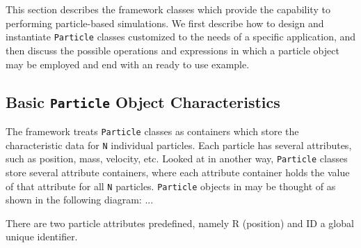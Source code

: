 \chapter{}
\label{sec:particles}
This section describes the \ippl framework classes which provide the capability to performing particle-based simulations. We first describe how to design and instantiate \texttt{Particle} classes customized to the needs of a specific application, and then discuss the possible operations and expressions in which a particle object may be employed and end with an ready to use example.

\section{Basic \texttt{Particle} Object Characteristics}

The \ippl framework treats \texttt{Particle} classes as containers which store the characteristic data for \texttt{N} individual particles. Each particle has several attributes, such as position, mass, velocity, etc. Looked at in another way, \texttt{Particle} classes store several attribute containers, where each attribute container holds the value of that attribute for all \texttt{N} particles. \texttt{Particle} objects in \ippl may be thought of as shown in the following diagram: ...

There are two particle attributes predefined, namely R (position) and ID a global unique identifier.


